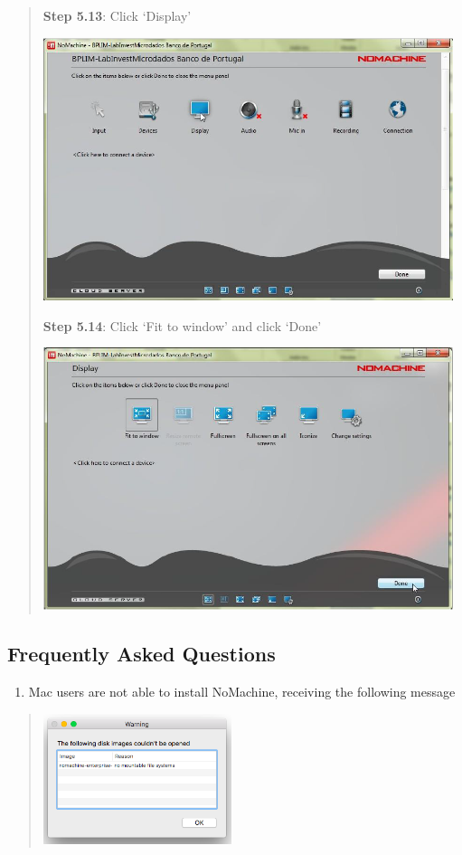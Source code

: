 \documentclass[
  11pt,
  a4paper,
]{article}
\providecommand{\tightlist}{%
  \setlength{\itemsep}{0pt}\setlength{\parskip}{0pt}}
\begin{document}
\begin{quote}
\textbf{Step 5.13}: Click `Display'

\includegraphics[width=4.72441in,height=3.0268in]{./media/image39.png}

\textbf{Step 5.14}: Click `Fit to window' and click `Done'

\includegraphics[width=4.72441in,height=3.02195in]{./media/image40.png}
\end{quote}

\hypertarget{frequently-asked-questions}{%
\subsection{Frequently Asked
Questions}\label{frequently-asked-questions}}

\begin{enumerate}
\def\labelenumi{\arabic{enumi}.}
\tightlist
\item
  Mac users are not able to install NoMachine, receiving the following
  message
\end{enumerate}

\begin{quote}
\includegraphics[width=2.16535in,height=1.49697in]{./media/image45.png}
\end{quote}
\end{document}
